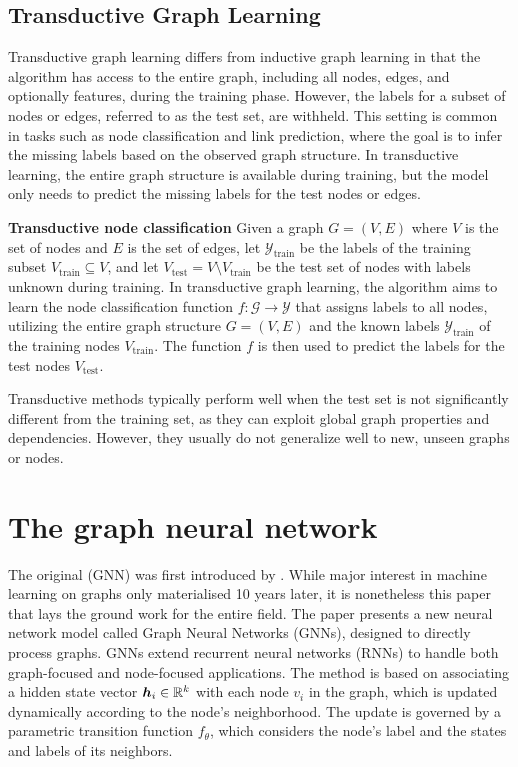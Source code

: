 \subsection{Transductive Graph Learning}

Transductive graph learning differs from inductive graph learning in that the algorithm has access to the entire graph, including all nodes, edges, and optionally features, during the training phase. However, the labels for a subset of nodes or edges, referred to as the test set, are withheld. This setting is common in tasks such as node classification and link prediction, where the goal is to infer the missing labels based on the observed graph structure. In transductive learning, the entire graph structure is available during training, but the model only needs to predict the missing labels for the test nodes or edges.

\begin{example}\textbf{Transductive node classification}
	Given a graph \( G = \left( V, E \right) \) where \( V \) is the set of nodes and \( E \) is the set of edges, let \( \mathcal{Y}_\mathrm{train} \) be the labels of the training subset \( V_\mathrm{train} \subseteq V \), and let \( V_\mathrm{test} = V \setminus V_\mathrm{train} \) be the test set of nodes with labels unknown during training. In transductive graph learning, the algorithm aims to learn the node classification function \( f: \mathcal{G} \rightarrow \mathcal{Y} \) that assigns labels to all nodes, utilizing the entire graph structure \( G = \left( V, E \right) \) and the known labels \( \mathcal{Y}_\mathrm{train} \) of the training nodes \( V_\mathrm{train} \). The function \( f \) is then used to predict the labels for the test nodes \( V_\mathrm{test} \).
\end{example}

Transductive methods typically perform well when the test set is not significantly different from the training set, as they can exploit global graph properties and dependencies. However, they usually do not generalize well to new, unseen graphs or nodes.

\section{The graph neural network}\label{sec:gori}

The original  (GNN) was first introduced by \cite{gori_new_2005}. While major interest in machine learning on graphs only materialised 10 years later, it is nonetheless this paper that lays the ground work for the entire field. The paper presents a new neural network model called Graph Neural Networks (GNNs), designed to directly process graphs. GNNs extend recurrent neural networks (RNNs) to handle both graph-focused and node-focused applications. The method is based on associating a hidden state vector \( \bm{h}_i \in \mathbb{R}^k \) with each node \( v_i \) in the graph, which is updated dynamically according to the node's neighborhood. The update is governed by a parametric transition function \( f_\theta \), which considers the node's label and the states and labels of its neighbors.

